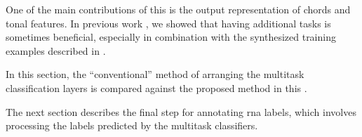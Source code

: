 
One of the main contributions of this \thesisdiss{} is the
output representation of chords and tonal features. In
previous work \parencite{napoleslopez2021augmentednet}, we
showed that having additional tasks is sometimes beneficial,
especially in combination with the synthesized training
examples described in
.

In this section, the ``conventional'' method of arranging
the multitask classification layers is compared against the
proposed method in this \thesisdiss{}.

The next section describes the final step for annotating
\gls{rna} labels, which involves processing the labels
predicted by the multitask classifiers.
